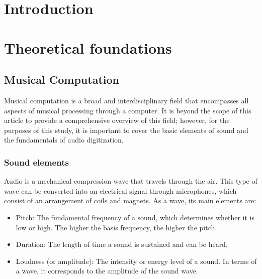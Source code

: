 \documentclass[sigconf,natbib=false]{acmart}
\begin{document}



\maketitle

\section{Introduction}

\section{Theoretical foundations}
\subsection{Musical Computation}

Musical computation is a broad and interdisciplinary field that encompasses all aspects of musical processing through a computer. It is beyond the scope of this article to provide a comprehensive overview of this field; however, for the purposes of this study, it is important to cover the basic elements of sound and the fundamentals of audio digitization.

\subsubsection{Sound elements}

Audio is a mechanical compression wave that travels through the air. This type of wave can be converted into an electrical signal through microphones, which consist of an arrangement of coils and magnets. As a wave, its main elements are:

\begin{itemize}
\item Pitch: The fundamental frequency of a sound, which determines whether it is low or high. The higher the basis frequency, the higher the pitch.
\item Duration: The length of time a sound is sustained and can be heard.
\item Loudness (or amplitude): The intensity or energy level of a sound. In terms of a wave, it corresponds to the amplitude of the sound wave.
\end{itemize}
\end{document}
